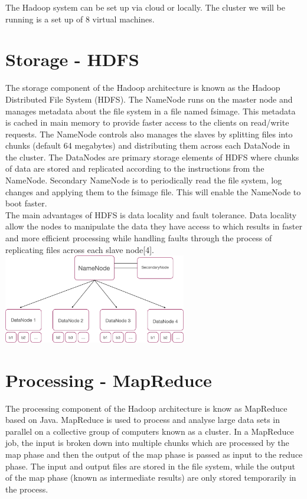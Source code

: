\documentclass[11pt]{book}
\begin{document}
The Hadoop system can be set up via cloud or locally. The cluster we will be running is a set up of 8 virtual machines.

\section{Storage - HDFS}

The storage component of the Hadoop architecture is known as the Hadoop Distributed File System (HDFS). The NameNode runs on the master node and manages metadata about the file system in a file named fsimage. This metadata is cached in main memory to provide faster access to the clients on read/write requests. The NameNode controls also manages the slaves by splitting files into chunks (default 64 megabytes) and distributing them across each DataNode in the cluster. The DataNodes are primary storage elements of HDFS where chunks of data are stored and replicated according to the instructions from the NameNode. Secondary NameNode is to periodically read the file system, log changes and applying them to the fsimage file. This will enable the NameNode to boot faster.\\

The main advantages of HDFS is data locality and fault tolerance. Data locality allow the nodes to manipulate the data they have access to which results in faster and more efficient processing while handling faults through the process of replicating files across each slave node[4].\\

\includegraphics[width=8cm]{hdfs}

\section{Processing - MapReduce}

The processing component of the Hadoop architecture is know as MapReduce based on Java. MapReduce is used to process and analyse large data sets in parallel on a collective group of computers known as a cluster. In a MapReduce job, the input is broken down into multiple chunks which are processed by the map phase and then the output of the map phase is passed as input to the reduce phase. The input and output files are stored in the file system, while the output of the map phase (known as intermediate results) are only stored temporarily in the process.\\
\end{document}
